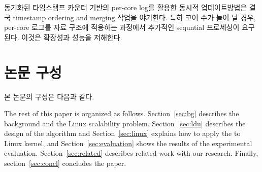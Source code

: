 
동기화된 타임스탬프 카운터 기반의 per-core log를 활용한 동시적 업데이트방법은 결국 timestamp ordering and
merging 작업을 야기한다.
특히 코어 수가 늘어 날 경우, per-core 로그를 자료 구조에 적용하는 과정에서 추가적인 sequntial 프로세싱이 요구된다.
이것은 확장성과 성능을 저해한다. 

\section{논문 구성} \label{sec:intro}
본 논문의 구성은 다음과 같다.

The rest of this paper is organized as follows.
Section~\ref{sec:bg} describes the background and the Linux scalability problem.
Section~\ref{sec:ldu} describes the design of the \LDU algorithm and 
Section~\ref{sec:linux} explains how to apply the \LDU to Linux kernel, and
Section~\ref{sec:evaluation} shows the results of the experimental evaluation. 
Section~\ref{sec:related} describes related work with our research.
Finally, section~\ref{sec:concl} concludes the paper.
